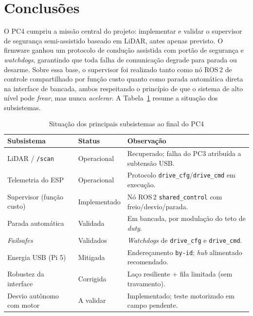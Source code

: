 \documentclass[conference]{IEEEtran}
\begin{document}
\section{Conclusões}

O PC4 cumpriu a missão central do projeto: implementar e validar o supervisor
de segurança semi-assistido baseado em LiDAR, antes apenas previsto. O firmware
ganhou um protocolo de condução assistida com portão de segurança e
\emph{watchdogs}, garantindo que toda falha de comunicação degrade para parada
ou desarme. Sobre essa base, o supervisor foi realizado tanto como nó ROS\,2 de
controle compartilhado por função custo quanto como parada automática direta na
interface de bancada, ambos respeitando o princípio de que o sistema de alto
nível pode \emph{frear}, mas nunca \emph{acelerar}. A Tabela~\ref{tab:status}
resume a situação dos subsistemas.

\begin{table}[!t]
\caption{Situação dos principais subsistemas ao final do PC4}
\label{tab:status}
\centering
\footnotesize
\renewcommand{\arraystretch}{1.2}
\begin{tabular}{@{}p{}p{}p{}@{}}
\hline
\textbf{Subsistema} & \textbf{Status} & \textbf{Observação} \\
\hline
LiDAR / \texttt{/scan}        & Operacional & Recuperado; falha do PC3 atribuída a subtensão USB. \\
Telemetria do ESP             & Operacional & Protocolo \texttt{drive\_cfg}/\texttt{drive\_cmd} em execução. \\
Supervisor (função custo)     & Implementado & Nó ROS\,2 \texttt{shared\_control} com freio/desvio/parada. \\
Parada automática             & Validada     & Em bancada, por modulação do teto de \emph{duty}. \\
\emph{Failsafes}              & Validados    & \emph{Watchdogs} de \texttt{drive\_cfg} e \texttt{drive\_cmd}. \\
Energia USB (Pi 5)            & Mitigada     & Endereçamento \texttt{by-id}; \emph{hub} alimentado recomendado. \\
Robustez da interface         & Corrigida    & Laço resiliente + fila limitada (sem travamento). \\
Desvio autônomo com motor     & A validar    & Implementado; teste motorizado em campo pendente. \\
\hline
\end{tabular}
\end{table}
\end{document}

